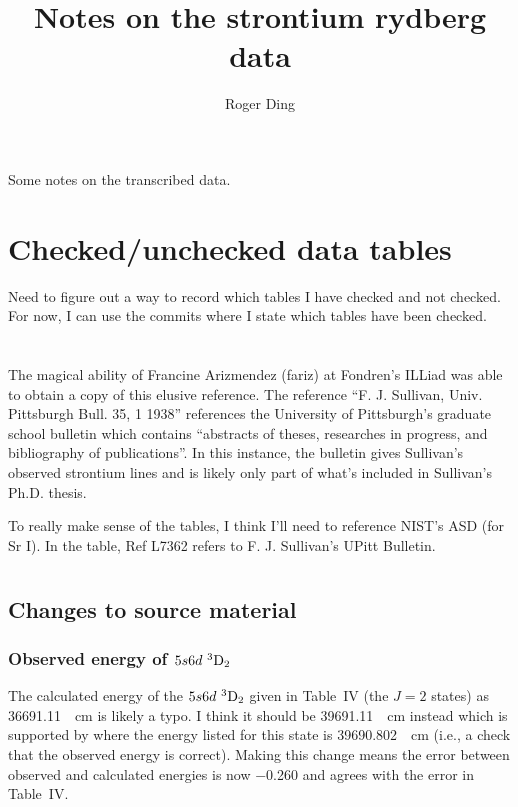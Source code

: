 \documentclass{article}
\title{Notes on the strontium rydberg data}
\author{Roger Ding}
\newcommand{\tsup}{\textsuperscript}													%
\newcommand{\tsub}{\textsubscript}														%
\newcommand{\SLJ}[3]{\tsup{#1}\textnormal{#2}\tsub{#3}}
\newcommand{\nSLJ}[4]{{#1}\textnormal{ }\SLJ{#2}{#3}{#4}}
\begin{document}
\maketitle


Some notes on the transcribed data.

\section{Checked/unchecked data tables}

Need to figure out a way to record which tables I have checked and not checked. For now, I can use the commits where I state which tables have been checked.

\section{}

The magical ability of Francine Arizmendez (fariz) at Fondren's ILLiad was able to obtain a copy of this elusive reference. The reference ``F. J. Sullivan, Univ. Pittsburgh Bull. 35, 1 1938'' references the University of Pittsburgh's graduate school bulletin which contains ``abstracts of theses, researches in progress, and bibliography of publications''. In this instance, the bulletin gives Sullivan's observed strontium lines and is likely only part of what's included in Sullivan's Ph.D. thesis. 

To really make sense of the tables, I think I'll need to reference NIST's ASD (for Sr I). In the table, Ref L7362 refers to F. J. Sullivan's UPitt Bulletin. 

\section{}

\subsection{Changes to source material}

\subsubsection{Observed energy of $\nSLJ{5s6d}{3}{D}{2}$}

The calculated energy of the $\nSLJ{5s6d}{3}{D}{2}$ given in Table~IV (the ${J=2}$ states) as \SI{36691.11}{\per\cm} is likely a typo. I think it should be \SI{39691.11}{\per\cm} instead which is supported by \cite{san_2010} where the energy listed for this state is \SI{39690.802}{\per\cm} (i.e., a check that the observed energy is correct). Making this change means the error between observed and calculated energies is now \num{-0.260} and agrees with the error in Table~IV.
\end{document}
